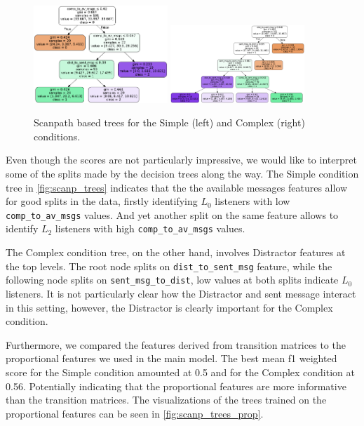 \begin{figure}
    \centering
    \includegraphics[width=0.45\textwidth]{images/tree_classifier_scanp_simple.png}
    \includegraphics[width=0.45\textwidth]{images/tree_classifier_scanp_complex.png}
    \caption{Scanpath based trees for the Simple (left) and Complex (right) conditions.}
    \label{fig:scanp_trees}
\end{figure}

Even though the scores are not particularly impressive, we would like to interpret some of the splits made by the decision trees along the way. The Simple condition tree in \autoref{fig:scanp_trees} indicates that the the available messages features allow for good splits in the data, 
firstly identifying $L_0$ listeners with low \texttt{comp\_to\_av\_msgs} values. And yet another split on the same feature allows to identify $L_2$ listeners with high \texttt{comp\_to\_av\_msgs} values.

The Complex condition tree, on the other hand, involves Distractor features at the top levels. The root node splits on \texttt{dist\_to\_sent\_msg} feature, while the following node splits on \texttt{sent\_msg\_to\_dist}, low values at both splits indicate $L_0$ listeners. It is not particularly clear how the Distractor and sent message interact in this setting, however, the Distractor is clearly important for the Complex condition.


Furthermore, we compared the features derived from transition matrices to the proportional features we used in the main model. The best mean f1 weighted score for the Simple condition amounted at 0.5 and for the Complex condition at 0.56. Potentially indicating that the proportional features are more informative than the transition matrices. The visualizations of the trees trained on the proportional features can be seen in \autoref{fig:scanp_trees_prop}. 

